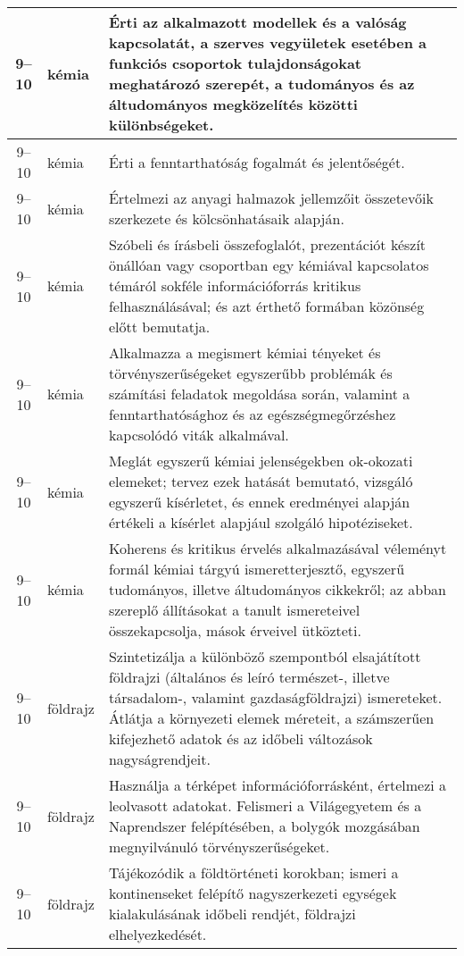 \begin{small}
\begin{longtable}{c | p{2cm} |  p{11cm} }
              9--10 & kémia & Érti az alkalmazott modellek és a valóság kapcsolatát, a szerves vegyületek esetében a funkciós csoportok tulajdonságokat meghatározó szerepét, a tudományos és az áltudományos megközelítés közötti különbségeket. \\ \hline
              9--10 & kémia & Érti a fenntarthatóság fogalmát és jelentőségét. \\ \hline
              9--10 & kémia & Értelmezi az anyagi halmazok jellemzőit összetevőik szerkezete és kölcsönhatásaik alapján. \\ \hline
              9--10 & kémia & Szóbeli és írásbeli összefoglalót, prezentációt készít önállóan vagy csoportban egy kémiával kapcsolatos témáról sokféle információforrás kritikus felhasználásával; és azt érthető formában közönség előtt bemutatja. \\ \hline
              9--10 & kémia & Alkalmazza a megismert kémiai tényeket és törvényszerűségeket egyszerűbb problémák és számítási feladatok megoldása során, valamint a fenntarthatósághoz és az egészségmegőrzéshez kapcsolódó viták alkalmával. \\ \hline
              9--10 & kémia & Meglát egyszerű kémiai jelenségekben ok-okozati elemeket; tervez ezek hatását bemutató, vizsgáló egyszerű kísérletet, és ennek eredményei alapján értékeli a kísérlet alapjául szolgáló hipotéziseket. \\ \hline
              9--10 & kémia & Koherens és kritikus érvelés alkalmazásával véleményt formál kémiai tárgyú ismeretterjesztő, egyszerű tudományos, illetve áltudományos cikkekről; az abban szereplő állításokat a tanult ismereteivel összekapcsolja, mások érveivel ütközteti. \\ \hline
              9--10 & földrajz & Szintetizálja a különböző szempontból elsajátított földrajzi (általános és leíró természet-, illetve társadalom-, valamint gazdaságföldrajzi) ismereteket. Átlátja a környezeti elemek méreteit, a számszerűen kifejezhető adatok és az időbeli változások nagyságrendjeit. \\ \hline
              9--10 & földrajz & Használja a térképet információforrásként, értelmezi a leolvasott adatokat. Felismeri a Világegyetem és a Naprendszer felépítésében, a bolygók mozgásában megnyilvánuló törvényszerűségeket. \\ \hline
              9--10 & földrajz & Tájékozódik a földtörténeti korokban; ismeri a kontinenseket felépítő nagyszerkezeti egységek kialakulásának időbeli rendjét, földrajzi elhelyezkedését. \\ \hline

\end{longtable}
\end{small}
